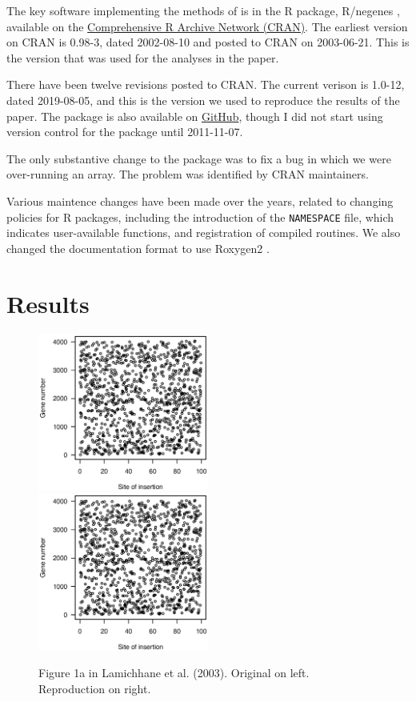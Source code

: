 The key software implementing the methods of \citet{lamichhane2003}
is in the R package, R/negenes \citep{negenes}, available on the
\href{https://cran.r-project.org/package=negenes}{Comprehensive R
Archive Network (CRAN)}. The earliest version on CRAN is 0.98-3, dated
2002-08-10 and posted to CRAN on 2003-06-21. This is the version that
was used for the analyses in the paper.

There have been twelve revisions posted to CRAN. The current verison
is 1.0-12, dated 2019-08-05, and this is the version we used to
reproduce the results of the paper. The package is also available on
\href{https://github.com/kbroman/negenes}{GitHub}, though I did not
start using version control for the package until 2011-11-07.

The only substantive change to the package was to fix a bug in which
we were over-running an array. The problem was identified by CRAN
maintainers.

Various maintence changes have been made over the years, related to
changing policies for R packages, including the introduction of
the \verb|NAMESPACE| file, which indicates user-available functions,
and registration of compiled routines. We also changed the
documentation format to use Roxygen2 \citep{roxygen2}.


\section{Results}


\begin{figure}
\includegraphics[viewport=133 224 464 528, width=0.50\textwidth]{../original/Nov02/R/Figs/fig1.ps}
\hfill
\includegraphics[viewport=133 224 464 528, width=0.50\textwidth]{../reproduction/Figs/fig1.ps}

\caption{Figure 1a in Lamichhane et al. (2003). Original on left. Reproduction on right.\label{fig:fig1a}}
\end{figure}

